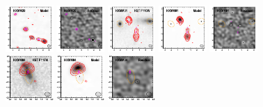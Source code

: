 \documentclass[iop]{emulateapj}
\begin{document}
\begin{figure}[!tbp]
\begin{centering}
\includegraphics[width=0.162\textwidth]{HXMM20_model_bestfit.pdf}
\includegraphics[width=0.162\textwidth]{HXMM20_residual_bestfit.pdf}
\includegraphics[width=0.162\textwidth]{HXMM01_optical_bestfit.pdf}
\includegraphics[width=0.162\textwidth]{HXMM01_model_bestfit.pdf}
\includegraphics[width=0.162\textwidth]{HXMM01_residual_bestfit.pdf}
\includegraphics[width=0.162\textwidth]{HXMM04_optical_bestfit.pdf}
\includegraphics[width=0.162\textwidth]{HXMM04_model_bestfit.pdf}
\includegraphics[width=0.162\textwidth]{HXMM04_residual_bestfit.pdf}

\end{centering}
\end{figure}
\end{document}
